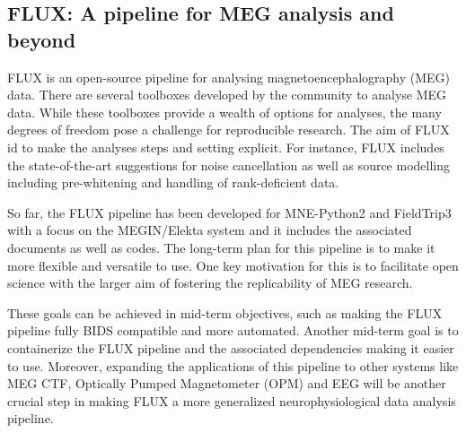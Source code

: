 \documentclass[../main.tex]{subfiles}
\begin{document}
\subsection{FLUX: A pipeline for MEG analysis and beyond}

%

FLUX \parencite{Ferrante2022} is an open-source pipeline for analysing magnetoencephalography (MEG) data. There are several toolboxes developed by the community to analyse MEG data. While these toolboxes provide a wealth of options for analyses, the many degrees of freedom pose a challenge for reproducible research. The aim of FLUX id to make the analyses steps and setting explicit. For instance, FLUX includes the state-of-the-art suggestions for noise cancellation as well as source modelling including pre-whitening and handling of rank-deficient data.

So far, the FLUX pipeline has been developed for MNE-Python2 \parencite{Gramfort2014} and FieldTrip3 \parencite{Oostenveld2011} with a focus on the MEGIN/Elekta system and it includes the associated documents as well as codes.
The long-term plan for this pipeline is to make it more flexible and versatile to use. One key motivation for this is to facilitate open science with the larger aim of fostering the replicability of MEG research.

These goals can be achieved in mid-term objectives, such as making the FLUX pipeline fully BIDS compatible and more automated. Another mid-term goal is to containerize the FLUX pipeline and the associated dependencies making it easier to use. Moreover, expanding the applications of this pipeline to other systems like MEG CTF, Optically Pumped Magnetometer (OPM) and EEG will be another crucial step in making FLUX a more generalized neurophysiological data analysis pipeline.
\end{document}
